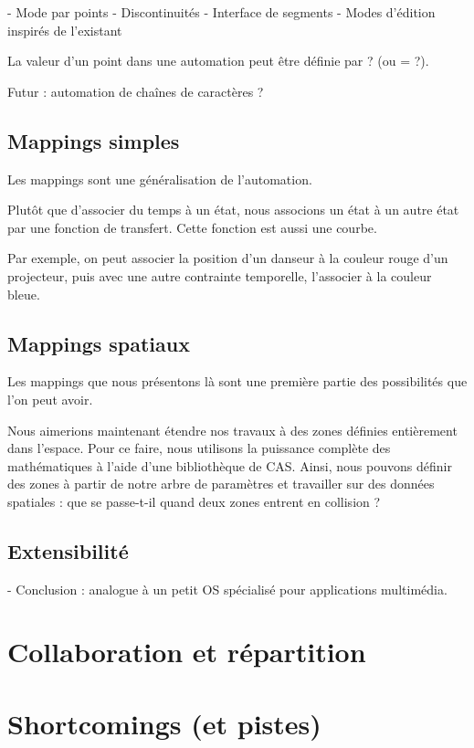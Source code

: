\documentclass{sigchi}
\begin{document}
- Mode par points
- Discontinuités
- Interface de segments
- Modes d'édition inspirés de l'existant

La valeur d'un point dans une automation peut être définie par ? (ou = ?).

Futur : automation de chaînes de caractères ?

\subsection{Mappings simples}
Les mappings sont une généralisation de l'automation.

Plutôt que d'associer du temps à un état, nous associons un état à un autre état par une fonction de transfert. Cette fonction est aussi une courbe.

Par exemple, on peut associer la position d'un danseur à la couleur rouge d'un projecteur, puis avec une autre contrainte temporelle, l'associer à la couleur bleue.


\subsection{Mappings spatiaux}

Les mappings que nous présentons là sont une première partie des possibilités que l'on peut avoir.

Nous aimerions maintenant étendre nos travaux à des zones définies entièrement dans l'espace. Pour ce faire, nous utilisons la puissance complète des mathématiques à l'aide d'une bibliothèque de CAS. Ainsi, nous pouvons définir des zones à partir de notre arbre de paramètres et travailler sur des données spatiales : que se passe-t-il quand deux zones entrent en collision ?
    
\subsection{Extensibilité}

- Conclusion : analogue à un petit OS spécialisé pour applications multimédia.

\section{Collaboration et répartition}

\section{Shortcomings (et pistes)}
\end{document}
